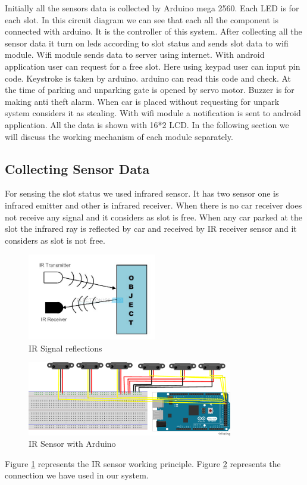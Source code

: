 Initially all the sensors data is collected by Arduino mega 2560. Each LED is for each slot. In this circuit diagram we can see that each all the component is connected with arduino. It is the controller of this system. After collecting all the sensor data it turn on leds according to slot status and sends slot data to wifi module. Wifi module sends data to server using internet. With android application user can request for a free slot. Here using keypad user can input pin code. Keystroke is taken by arduino. arduino can read this code and check. At the time of parking and unparking gate is opened by servo motor. Buzzer is for making anti theft alarm. When car is placed without requesting for unpark system considers it as  stealing. With wifi module a notification is sent to android application. 
All the data is shown with 16*2 LCD. In the following section we will discuss the working mechanism of each module separately. 

\subsection{Collecting Sensor Data}
For sensing the slot status we used infrared sensor. It has two sensor one is infrared emitter and other is infrared receiver. When there is no car receiver does not receive any signal and it considers as slot is free. When any car parked at the slot the infrared ray is reflected by car and received by IR receiver sensor and it considers as slot is not free.
\begin{figure}[H]
\centering
\includegraphics[width=0.5\textwidth]{figures/ir_sensors_work.jpg}
\caption{IR Signal reflections}
\label{ir_work}
\end{figure}

\begin{figure}[H]
\centering
\includegraphics[width=0.8\textwidth]{figures/sensor_bb.png}
\caption{IR Sensor with Arduino}
\label{Ir_sensor_arduino}
\end{figure}
Figure \ref{ir_work} represents the IR sensor working principle. Figure \ref{Ir_sensor_arduino} represents the connection we have used in our system. 

